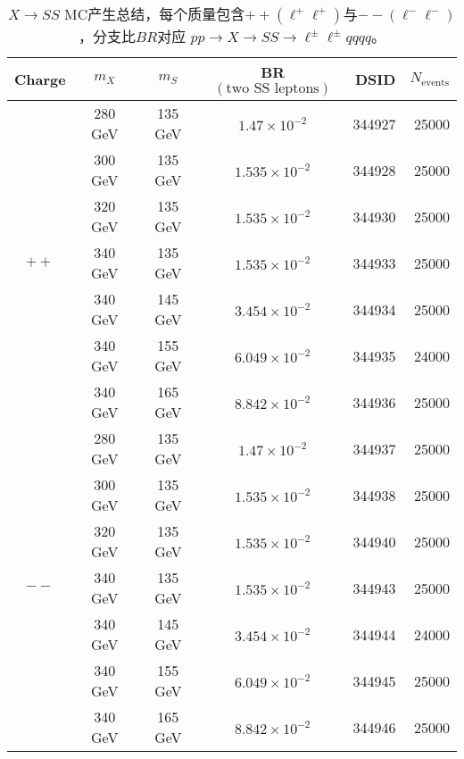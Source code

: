 \begin{table}[!htbp]
  \centering
  \begin{tabular}{c c c c r r}
    \hline
    \hline
    Charge & $m_X$ & $m_S$ & BR$(\text{two SS leptons})$ & DSID & $N_{\text{events}}$ \\
    \hline
    \multirow{7}{*}{$++$} & 280 GeV & 135 GeV & $1.47\times10^{-2}$ &344927  & 25000 \\
     & 300 GeV & 135 GeV & $1.535\times10^{-2}$ &344928  & 25000 \\
     & 320 GeV & 135 GeV & $1.535\times10^{-2}$ &344930  & 25000 \\
     & 340 GeV & 135 GeV & $1.535\times10^{-2}$ &344933  & 25000 \\
     & 340 GeV & 145 GeV & $3.454\times10^{-2}$ &344934  & 25000 \\
     & 340 GeV & 155 GeV & $6.049\times10^{-2}$ &344935  & 24000 \\
     & 340 GeV & 165 GeV & $8.842\times10^{-2}$ &344936  & 25000 \\
    \hline
    \multirow{7}{*}{$--$} & 280 GeV & 135 GeV & $1.47\times10^{-2}$ &344937  & 25000 \\
     & 300 GeV & 135 GeV & $1.535\times10^{-2}$ &344938  & 25000 \\
     & 320 GeV & 135 GeV & $1.535\times10^{-2}$ &344940  & 25000 \\
     & 340 GeV & 135 GeV & $1.535\times10^{-2}$ &344943  & 25000 \\
     & 340 GeV & 145 GeV & $3.454\times10^{-2}$ &344944  & 24000 \\
     & 340 GeV & 155 GeV & $6.049\times10^{-2}$ &344945  & 25000 \\
     & 340 GeV & 165 GeV & $8.842\times10^{-2}$ &344946  & 25000 \\
    \hline
    \hline
  \end{tabular}
  \caption{$X\rightarrow SS$ MC产生总结，每个质量包含$++(\ell^+\ell^+)$与$--(\ell^-\ell^-)$，分支比$BR$对应
$pp\rightarrow X\rightarrow SS\rightarrow \ell^{\pm}\ell^{\pm}qqqq$。}
  \label{tab:dsid_SS}
\end{table}
